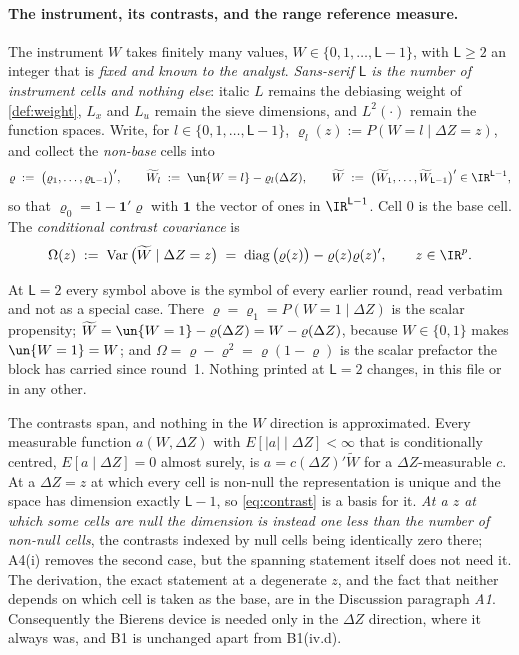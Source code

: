 \paragraph{The instrument, its contrasts, and the range reference measure.}
The instrument $W$ takes finitely many values, $W\in\{0,1,\dots,\mathsf L-1\}$, with
$\mathsf L\ge2$ an integer that is \emph{fixed and known to the analyst}. \emph{Sans-serif
$\mathsf L$ is the number of instrument cells and nothing else}: italic $L$ remains the debiasing
weight of \cref{def:weight}, $L_x$ and $L_u$ remain the sieve dimensions, and $L^{2}(\cdot)$ remain the
function spaces. Write, for $l\in\{0,1,\dots,\mathsf L-1\}$,
$\varrho_l(z):=P(W=l\mid\Delta Z=z)$, and collect the \emph{non-base} cells into
\begin{equation}\label{eq:contrast}
\varrho\;:=\;\big(\varrho_1,\dots,\varrho_{\mathsf L-1}\big)',
\qquad
\widetilde W_l\;:=\;\un\{W=l\}-\varrho_l(\Delta Z),
\qquad
\widetilde W\;:=\;\big(\widetilde W_1,\dots,\widetilde W_{\mathsf L-1}\big)'\in\IR^{\mathsf L-1},
\end{equation}
so that $\varrho_0=1-\mathbf 1'\varrho$ with $\mathbf 1$ the vector of ones in $\IR^{\mathsf L-1}$.
Cell $0$ is the base cell. The \emph{conditional contrast covariance} is
\begin{equation}\label{eq:omegadef}
\Omega(z)\;:=\;\operatorname{Var}\big(\widetilde W\mid\Delta Z=z\big)\;=\;\operatorname{diag}\big(\varrho(z)\big)-\varrho(z)\varrho(z)' ,
\qquad z\in\IR^{p} .
\end{equation}

At $\mathsf L=2$ every symbol above is the symbol of every earlier round, read verbatim and not
as a special case. There $\varrho=\varrho_1=P(W=1\mid\Delta Z)$ is the scalar propensity;
$\widetilde W=\un\{W=1\}-\varrho(\Delta Z)=W-\varrho(\Delta Z)$, because $W\in\{0,1\}$ makes
$\un\{W=1\}=W$; and $\Omega=\varrho-\varrho^{2}=\varrho(1-\varrho)$ is the scalar prefactor the block
has carried since round~1. Nothing printed at $\mathsf L=2$ changes, in this file or in any
other.

The contrasts span, and nothing in the $W$ direction is approximated. Every measurable function
$a(W,\Delta Z)$ with $E[|a|\mid\Delta Z]<\infty$ that is conditionally centred,
$E[a\mid\Delta Z]=0$ almost surely, is
$a=c(\Delta Z)'\widetilde W$ for a $\Delta Z$-measurable $c$. At a $\Delta Z=z$ at which every cell
is non-null the representation is unique and the space has dimension exactly $\mathsf L-1$, so
\eqref{eq:contrast} is a basis for it. \emph{At a $z$ at which some cells are null the dimension is
instead one less than the number of non-null cells}, the contrasts indexed by null cells being
identically zero there; A4(i) removes the second case, but the spanning statement itself does not need
it. The derivation, the exact statement at a degenerate $z$, and the
fact that neither depends on which cell is taken as the base, are in the Discussion
paragraph \emph{A1}. Consequently the Bierens device is needed only in the $\Delta Z$ direction,
where it always was, and B1 is unchanged apart from B1(iv.d).

